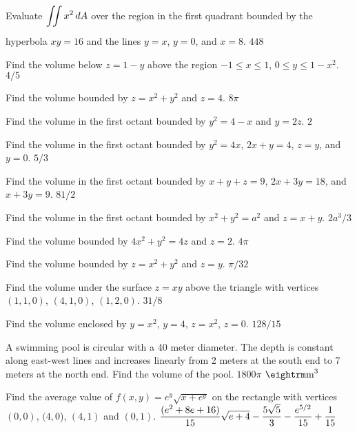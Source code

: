 \endexercise

\exercise Evaluate $\ds\dint{} x^2\,dA$ over the region in the first
quadrant bounded by the hyperbola $xy=16$ and the lines $y=x$, $y=0$, and
$x=8$.
\answer $448$
\endanswer
\endexercise

\exercise Find the volume below $z=1-y$ above the region
$-1\le x\le 1$, $0\le y\le 1-x^2$.
\answer $4/5$
\endanswer
\endexercise

\exercise Find the volume bounded by $z=x^2+y^2$ and $z=4$.
\answer $8\pi$
\endanswer

\endexercise

\exercise Find the volume in the first octant
bounded by $y^2=4-x$ and $y=2z$.
\answer $2$
\endanswer

\endexercise

\exercise Find the volume in the first octant
bounded by $y^2=4x$, $2x+y=4$, $z=y$,
and $y=0$.
\answer $5/3$
\endanswer
\endexercise

\exercise Find the volume in the first octant
bounded by $x+y+z=9$, $2x+3y=18$, and $x+3y=9$.
\answer $81/2$
\endanswer
\endexercise

\exercise Find the volume in the first octant
bounded by $x^2+y^2=a^2$ and $z=x+y$.
\answer $2a^3/3$
\endanswer
\endexercise

\exercise Find the volume bounded by $4x^2+y^2=4z$ and $z=2$.
\answer $4\pi$
\endanswer
\endexercise

\exercise Find the volume bounded by $z=x^2+y^2$ and $z=y$.
\answer $\pi/32$
\endanswer

\endexercise

\exercise Find the volume under the surface $z=xy$ above the triangle
with vertices $(1,1,0)$, $(4,1,0)$, $(1,2,0)$.
\answer $31/8$
\endanswer
\endexercise

\exercise Find the volume enclosed by $y=x^2$, $y=4$, $z=x^2$, $z=0$.
\answer $128/15$
\endanswer
\endexercise

\exercise A swimming pool is circular with a 40 meter diameter.  The
depth is constant along east-west lines and increases linearly from 2
meters at the south end to 7 meters at the north end.  Find the volume
of the pool.  
\answer $1800\pi$ ${\rm m}^3$ 
\endanswer

\endexercise

\exercise Find the average value of $f(x,y)=e^y\sqrt{x+e^y}$ on the
    rectangle with vertices $(0,0)$, $(4,0$), $(4,1)$ and $(0,1)$.
\answer $\displaystyle{(e^2+8e+16)\over15}\sqrt{e+4}-{5\sqrt5\over3}-{e^{5/2}\over15}
+{1\over15}$
\endanswer

